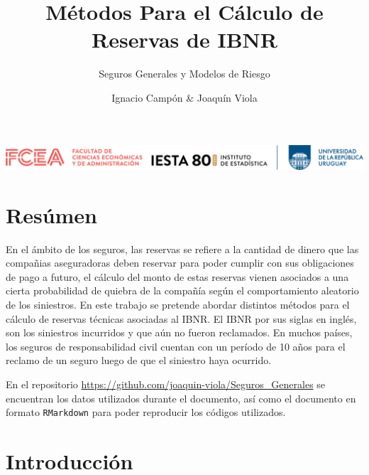 \documentclass[
  12pt,
]{article}
\title{Métodos Para el Cálculo de Reservas de IBNR}
\subtitle{Seguros Generales y Modelos de Riesgo}
\author{Ignacio Campón \& Joaquín Viola}
\date{}
\begin{document}
\maketitle

\maketitle

\thispagestyle{empty} %
\vspace*{\fill} %
\begin{center}
\includegraphics[width=16cm]{imagenes/logo_inst_80.png}\\[1cm] %
\end{center}

\newpage

\section{Resúmen}\label{resuxfamen}

En el ámbito de los seguros, las reservas se refiere a la cantidad de
dinero que las compañias aseguradoras deben reservar para poder cumplir
con sus obligaciones de pago a futuro, el cálculo del monto de estas
reservas vienen asociados a una cierta probabilidad de quiebra de la
compañía según el comportamiento aleatorio de los siniestros. En este
trabajo se pretende abordar distintos métodos para el cálculo de
reservas técnicas asociadas al IBNR. El IBNR por sus siglas en inglés,
son los siniestros incurridos y que aún no fueron reclamados. En muchos
países, los seguros de responsabilidad civil cuentan con un período de
10 años para el reclamo de un seguro luego de que el siniestro haya
ocurrido.

En el repositorio
\url{https://github.com/joaquin-viola/Seguros_Generales} se encuentran
los datos utilizados durante el documento, así como el documento en
formato \texttt{RMarkdown} para poder reproducir los códigos utilizados.

\newpage

\tableofcontents

\newpage

\section{Introducción}\label{introducciuxf3n}
\end{document}
